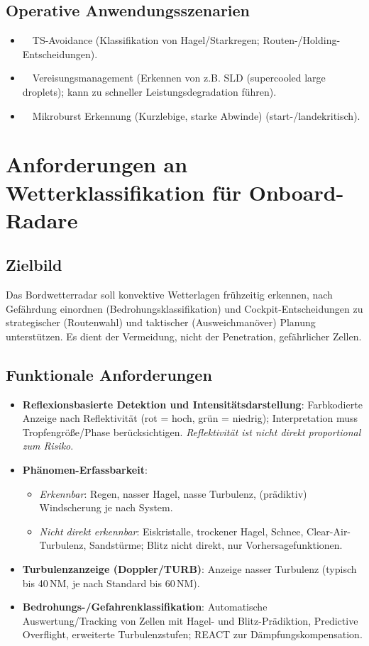 \subsection*{Operative Anwendungsszenarien}
\begin{itemize}[leftmargin=2.2em,itemsep=0.35em]
  \item \riskhigh\ \scopeboth\ TS-Avoidance (Klassifikation von Hagel/Starkregen; Routen-/Holding-Entscheidungen).
  \item \riskhigh\ \scopeboth\ Vereisungsmanagement (Erkennen von z.B. SLD (supercooled large droplets); kann zu schneller Leistungsdegradation führen).
  \item \riskhigh\ \scopeboth\ Mikroburst Erkennung (Kurzlebige, starke Abwinde) (start-/landekritisch).
\end{itemize}



\section{Anforderungen an Wetterklassifikation für Onboard-Radare  \parencite{marconnet2016optimumWeatherRadar}}

\subsection{Zielbild}
Das Bordwetterradar soll konvektive Wetterlagen frühzeitig erkennen, nach Gefährdung einordnen 
(Bedrohungs\-klassifikation) und Cockpit-Entscheidungen zu strategischer (Routenwahl) und taktischer 
(Ausweichmanöver) Planung unterstützen. Es dient der Vermeidung, nicht der Penetration, gefährlicher Zellen.

\subsection{Funktionale Anforderungen}
\begin{itemize}
  \item \textbf{Reflexionsbasierte Detektion und Intensitätsdarstellung}: Farbkodierte Anzeige nach Reflektivität (rot = hoch, grün = niedrig); Interpretation muss Tropfengröße/Phase berücksichtigen. \emph{Reflektivität ist nicht direkt proportional zum Risiko}.
  \item \textbf{Phänomen-Erfassbarkeit}: 
  \begin{itemize}
    \item \emph{Erkennbar}: Regen, nasser Hagel, nasse Turbulenz, (prädiktiv) Windscherung je nach System. 
    \item \emph{Nicht direkt erkennbar}: Eis\-kristalle, trockener Hagel, Schnee, Clear-Air-Turbulenz, Sandstürme; Blitz nicht direkt, nur Vorhersagefunktionen.
  \end{itemize}
  \item \textbf{Turbulenzanzeige (Doppler/TURB)}: Anzeige nasser Turbulenz (typisch bis 40\,NM, je nach Standard bis 60\,NM).
  \item \textbf{Bedrohungs-/Gefahrenklassifikation}: Automatische Auswertung/Tracking von Zellen mit Hagel- und Blitz-Prädiktion, Predictive Overflight, erweiterte Turbulenzstufen; REACT zur Dämpfungskompensation.
\end{itemize}

